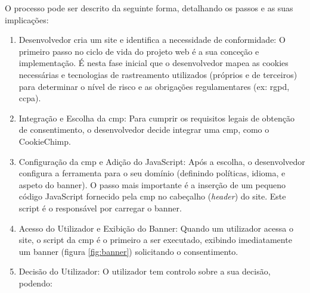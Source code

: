 \newpage

O processo pode ser descrito da seguinte forma, detalhando os passos e as suas implicações:

\begin{enumerate}
    \item Desenvolvedor cria um site e identifica a necessidade de conformidade: O primeiro passo no ciclo de vida do projeto web é a sua conceção e implementação. É nesta fase inicial que o desenvolvedor mapea as cookies necessárias e tecnologias de rastreamento utilizados (próprios e de terceiros) para determinar o nível de risco e as obrigações regulamentares (ex: \acrshort{rgpd}, \acrshort{ccpa}).
    \item Integração e Escolha da \acrshort{cmp}: Para cumprir os requisitos legais de obtenção de consentimento, o desenvolvedor decide integrar uma \acrshort{cmp}, como o CookieChimp.
    \item Configuração da \acrshort{cmp} e Adição do JavaScript: Após a escolha, o desenvolvedor configura a ferramenta para o seu domínio (definindo políticas, idioma, e aspeto do banner). O passo mais importante é a inserção de um pequeno código JavaScript fornecido pela \acrshort{cmp} no cabeçalho (\textit{header}) do site. Este script é o responsável por carregar o banner.
    \item Acesso do Utilizador e Exibição do Banner: Quando um utilizador acessa o site, o script da \acrshort{cmp} é o primeiro a ser executado, exibindo imediatamente um banner (figura \ref{fig:banner}) solicitando o consentimento.
    \item Decisão do Utilizador: O utilizador tem controlo sobre a sua decisão, podendo:


\end{enumerate}
